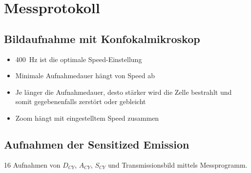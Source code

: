
\def\skalierung{0.65}

\chapter{Messprotokoll}
\label{chap:protokoll}

\section*{Bildaufnahme mit Konfokalmikroskop}
\label{sec:bildaufnahme}
\begin{itemize}
    \item \SI{400}{\hertz} ist die optimale Speed-Einstellung 
    \item Minimale Aufnahmedauer hängt von Speed ab
    \item Je länger die Aufnahmedauer, desto stärker wird die Zelle bestrahlt und somit gegebenenfalls zerstört oder gebleicht
    \item Zoom hängt mit eingestelltem Speed zusammen
\end{itemize}

\section*{Aufnahmen der Sensitized Emission}
\label{sec:aufnahme}
16 Aufnahmen von  $D_{CY}$, $A_{CY}$, $S_{CY}$ und Transmissionsbild mittels Messprogramm.\\


